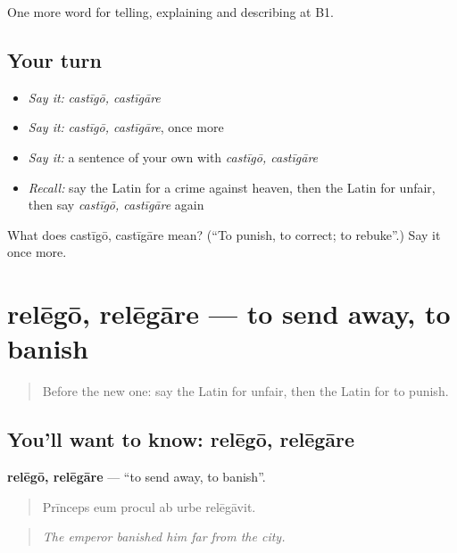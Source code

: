 \begin{grammarlens}[title={What you've built}]
One more word for telling, explaining and describing at B1.
\end{grammarlens}

\subsection*{Your turn}
\begin{itemize}
\raggedright
  \item \emph{Say it:} \emph{castīgō, castīgāre}
  \item \emph{Say it:} \emph{castīgō, castīgāre}, once more
  \item \emph{Say it:} a sentence of your own with \emph{castīgō, castīgāre}
  \item \emph{Recall:} say the Latin for a crime against heaven, then the Latin for unfair, then say \emph{castīgō, castīgāre} again
\end{itemize}

\begin{tcolorbox}[breakable,colback=teal!4,colframe=teal!35!black,title={Before you move on}]
What does castīgō, castīgāre mean? (\textquotedblleft{}To punish, to correct; to rebuke\textquotedblright{}.) Say it once more.
\end{tcolorbox}
\section[relēgō, relēgāre]{relēgō, relēgāre — to send away, to banish}

\label{lesson:LA-C415-relego}



\begin{quote}
Before the new one: say the Latin for unfair, then the Latin for to punish.
\end{quote}

\subsection*{You'll want to know: relēgō, relēgāre}
\textbf{relēgō, relēgāre} — \textquotedblleft{}to send away, to banish\textquotedblright{}.

\begin{quote}
Prīnceps eum procul ab urbe relēgāvit.
\end{quote}

\begin{quote}
\emph{The emperor banished him far from the city.}
\end{quote}

